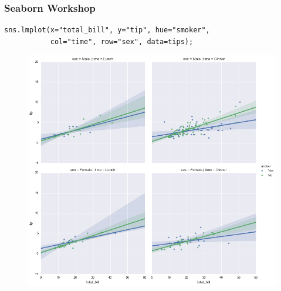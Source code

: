 \documentclass{beamer}
\begin{document}
\begin{frame}[fragile]
	\frametitle{Seaborn Workshop}
	\large
\begin{verbatim}
sns.lmplot(x="total_bill", y="tip", hue="smoker",
           col="time", row="sex", data=tips);
\end{verbatim}

\begin{figure}
	\centering
	\includegraphics[width=0.7\linewidth]{images/regression_44_0}
\end{figure}
\end{frame}
\end{document}
